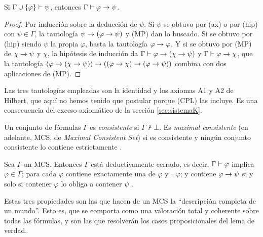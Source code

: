 \begin{proposicion}\label{prop:deduccion}
Si $\Gamma \cup \{\varphi\} \vdash \psi$, entonces $\Gamma \vdash \varphi \to \psi$.
\end{proposicion}
\begin{proof}
Por inducción sobre la deducción de $\psi$. Si $\psi$ se obtuvo por (ax) o por (hip) con $\psi \in \Gamma$, la tautología $\psi \to (\varphi \to \psi)$ y (MP) dan lo buscado. Si se obtuvo por (hip) siendo $\psi$ la propia $\varphi$, basta la tautología $\varphi \to \varphi$. Y si se obtuvo por (MP) de $\chi \to \psi$ y $\chi$, la hipótesis de inducción da $\Gamma \vdash \varphi \to (\chi \to \psi)$ y $\Gamma \vdash \varphi \to \chi$, que la tautología $(\varphi \to (\chi \to \psi)) \to ((\varphi \to \chi) \to (\varphi \to \psi))$ combina con dos aplicaciones de (MP).
\end{proof}

Las tres tautologías empleadas son la identidad y los axiomas A1 y A2 de Hilbert, que aquí no hemos tenido que postular porque (CPL) las incluye. Es una consecuencia del exceso axiomático de la sección \ref{sec:sistemaK}.

\begin{definicion}\label{def:consistente}
Un conjunto de fórmulas $\Gamma$ es \emph{consistente} si $\Gamma \nvdash \bot$. Es \emph{maximal consistente} (en adelante, MCS, de \emph{Maximal Consistent Set}) si es consistente y ningún conjunto consistente lo contiene estrictamente \cite[Def.~4.15]{blackburn}.
\end{definicion}

\begin{proposicion}\label{prop:mcs}
Sea $\Gamma$ un MCS. Entonces $\Gamma$ está deductivamente cerrado, es decir, $\Gamma \vdash \varphi$ implica $\varphi \in \Gamma$; para cada $\varphi$ contiene exactamente una de $\varphi$ y $\lnot\varphi$; y contiene $\varphi \to \psi$ si y solo si contener $\varphi$ lo obliga a contener $\psi$ \cite[Prop.~4.16]{blackburn}.
\end{proposicion}

Estas tres propiedades son las que hacen de un MCS la ``descripción completa de un mundo''. Esto es, que se comporta como una valoración total y coherente sobre todas las fórmulas, y son las que resolverán los casos proposicionales del lema de verdad.

